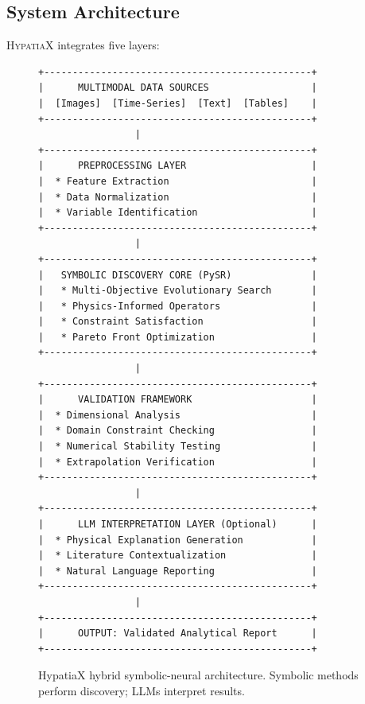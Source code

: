 \documentclass[twoside,11pt]{article}
\begin{document}
\subsection{System Architecture}

\textsc{HypatiaX} integrates five layers:

\begin{figure}[htbp]
\centering
\begin{small}
\begin{verbatim}
+-----------------------------------------------+
|      MULTIMODAL DATA SOURCES                  |
|  [Images]  [Time-Series]  [Text]  [Tables]    |
+-----------------------------------------------+
                 |
+-----------------------------------------------+
|      PREPROCESSING LAYER                      |
|  * Feature Extraction                         |
|  * Data Normalization                         |
|  * Variable Identification                    |
+-----------------------------------------------+
                 |
+-----------------------------------------------+
|   SYMBOLIC DISCOVERY CORE (PySR)              |
|   * Multi-Objective Evolutionary Search       |
|   * Physics-Informed Operators                |
|   * Constraint Satisfaction                   |
|   * Pareto Front Optimization                 |
+-----------------------------------------------+
                 |
+-----------------------------------------------+
|      VALIDATION FRAMEWORK                     |
|  * Dimensional Analysis                       |
|  * Domain Constraint Checking                 |
|  * Numerical Stability Testing                |
|  * Extrapolation Verification                 |
+-----------------------------------------------+
                 |
+-----------------------------------------------+
|      LLM INTERPRETATION LAYER (Optional)      |
|  * Physical Explanation Generation            |
|  * Literature Contextualization               |
|  * Natural Language Reporting                 |
+-----------------------------------------------+
                 |
+-----------------------------------------------+
|      OUTPUT: Validated Analytical Report      |
+-----------------------------------------------+
\end{verbatim}

\end{small}
\caption{HypatiaX hybrid symbolic-neural architecture. Symbolic methods perform discovery; LLMs interpret results.}
\label{fig:architecture}
\end{figure}
\end{document}
